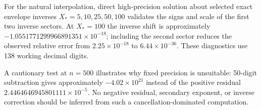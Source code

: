 For the natural interpolation, direct high-precision solution about selected
exact envelope inverses $X_*=5,10,25,50,100$ validates the signs and scale of
the first two inverse sectors. At $X_*=100$ the inverse shift is approximately
$-1.0551771299966891351\times10^{-18}$; including the second sector reduces
the observed relative error from $2.25\times10^{-18}$ to
$6.44\times10^{-36}$. These diagnostics use 138 working decimal digits.

A cautionary test at $n=500$ illustrates why fixed precision is unsuitable:
50-digit subtraction gives approximately $-4.02\times10^{21}$ instead of the
positive residual $2.4464646945801111\times10^{-5}$. No negative residual,
secondary exponent, or inverse correction should be inferred from such a
cancellation-dominated computation.

